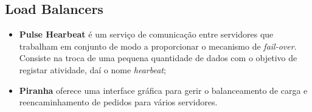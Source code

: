 \subsection{Load Balancers}
\begin{itemize}
	\item \textbf{Pulse Hearbeat} é um serviço de comunicação entre servidores que trabalham em conjunto de modo a proporcionar o mecanismo de \emph{fail-over}. Consiste na troca de uma pequena quantidade de dados com o objetivo de registar atividade, daí o nome \emph{hearbeat};
	\item \textbf{Piranha} oferece uma interface gráfica para gerir o balanceamento de carga e reencaminhamento de pedidos para vários servidores.
\end{itemize}


